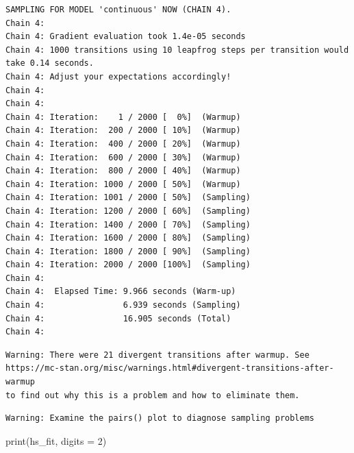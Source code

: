 \documentclass[
  letterpaper,
  DIV=11,
  numbers=noendperiod]{scrartcl}
\newenvironment{Shaded}{\begin{snugshade}}{\end{snugshade}}
\newcommand{\AttributeTok}[1]{\textcolor[rgb]{0.40,0.45,0.13}{#1}}
\newcommand{\DecValTok}[1]{\textcolor[rgb]{0.68,0.00,0.00}{#1}}
\newcommand{\FunctionTok}[1]{\textcolor[rgb]{0.28,0.35,0.67}{#1}}
\newcommand{\NormalTok}[1]{\textcolor[rgb]{0.00,0.23,0.31}{#1}}
\begin{document}
\begin{verbatim}
SAMPLING FOR MODEL 'continuous' NOW (CHAIN 4).
Chain 4: 
Chain 4: Gradient evaluation took 1.4e-05 seconds
Chain 4: 1000 transitions using 10 leapfrog steps per transition would take 0.14 seconds.
Chain 4: Adjust your expectations accordingly!
Chain 4: 
Chain 4: 
Chain 4: Iteration:    1 / 2000 [  0%]  (Warmup)
Chain 4: Iteration:  200 / 2000 [ 10%]  (Warmup)
Chain 4: Iteration:  400 / 2000 [ 20%]  (Warmup)
Chain 4: Iteration:  600 / 2000 [ 30%]  (Warmup)
Chain 4: Iteration:  800 / 2000 [ 40%]  (Warmup)
Chain 4: Iteration: 1000 / 2000 [ 50%]  (Warmup)
Chain 4: Iteration: 1001 / 2000 [ 50%]  (Sampling)
Chain 4: Iteration: 1200 / 2000 [ 60%]  (Sampling)
Chain 4: Iteration: 1400 / 2000 [ 70%]  (Sampling)
Chain 4: Iteration: 1600 / 2000 [ 80%]  (Sampling)
Chain 4: Iteration: 1800 / 2000 [ 90%]  (Sampling)
Chain 4: Iteration: 2000 / 2000 [100%]  (Sampling)
Chain 4: 
Chain 4:  Elapsed Time: 9.966 seconds (Warm-up)
Chain 4:                6.939 seconds (Sampling)
Chain 4:                16.905 seconds (Total)
Chain 4: 
\end{verbatim}

\begin{verbatim}
Warning: There were 21 divergent transitions after warmup. See
https://mc-stan.org/misc/warnings.html#divergent-transitions-after-warmup
to find out why this is a problem and how to eliminate them.
\end{verbatim}

\begin{verbatim}
Warning: Examine the pairs() plot to diagnose sampling problems
\end{verbatim}

\begin{Shaded}
\begin{Highlighting}[]
\FunctionTok{print}\NormalTok{(hs\_fit, }\AttributeTok{digits =} \DecValTok{2}\NormalTok{)}
\end{Highlighting}
\end{Shaded}
\end{document}
